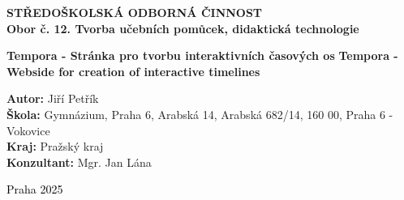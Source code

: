 \clearpageenabledfalse %
\newpage

\begin{center}
    \textbf{\large STŘEDOŠKOLSKÁ ODBORNÁ ČINNOST} \\[1cm]
    \textbf{Obor č. 12. Tvorba učebních pomůcek, didaktická technologie}
    
\end{center}

\vfill

\begin{center}
     \textbf{\Large {Tempora - Stránka pro tvorbu interaktivních časových os}}
    \newline
     \textbf{\Large {Tempora - Webside for creation of interactive timelines}}
\end{center}

\vfill

\begin{flushleft}
    \textbf{Autor:} {Jiří Petřík} \\[0.2cm]
    \textbf{Škola:} {Gymnázium, Praha 6, Arabská 14, Arabská 682/14,
    160 00, Praha 6 - Vokovice } \\[0.2cm]
    \textbf{Kraj:} Pražský kraj \\[0.2cm] 
    \textbf{Konzultant:} {Mgr. Jan Lána}
\end{flushleft}

\vspace{1cm}

\begin{flushleft}
    \textcolor{black}{Praha 2025}
\end{flushleft}
